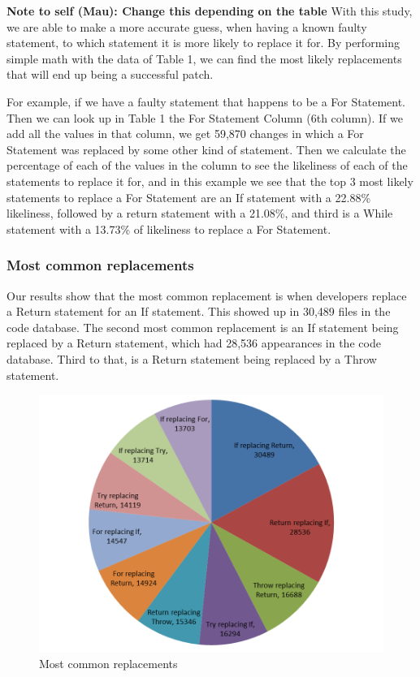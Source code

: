 \documentclass{sig-alternate-05-2015}
\newcommand{\todo}[1]
  {{\scriptsize \textbf{\color{red} {#1}}}}
\begin{document}
\todo{Note to self (Mau): Change this depending on the table}
With this study, we are able to make a more accurate guess, when having a known faulty statement, to which statement it is more likely to replace it for. By performing simple math with the data of Table 1, we can find the most likely replacements that will end up being a successful patch. 

For example, if we have a faulty statement that happens to be a For Statement. Then we can look up in Table 1 the For Statement Column (6th column). If we add all the values in that column, we get 59,870 changes in which a For Statement was replaced by some other kind of statement. Then we calculate the percentage of each of the values in the column to see the likeliness of each of the statements to replace it for, and in this example we see that the top 3 most likely statements to replace a For Statement are an If statement with a 22.88\% likeliness, followed by a return statement with a 21.08\%, and third is a While statement with a 13.73\% of likeliness to replace a For Statement.


\subsubsection{Most common replacements}
Our results show that the most common replacement is when developers replace a Return statement for an If statement. This showed up in 30,489 files in the code database. The second most common replacement is an If statement being replaced by a Return statement, which had 28,536 appearances in the code database. Third to that, is a Return statement being replaced by a Throw statement.

\begin{figure}[!t]
  \centering
      \includegraphics[scale=0.5]{g1.png}
  \caption{Most common replacements}
\end{figure}
\end{document}

